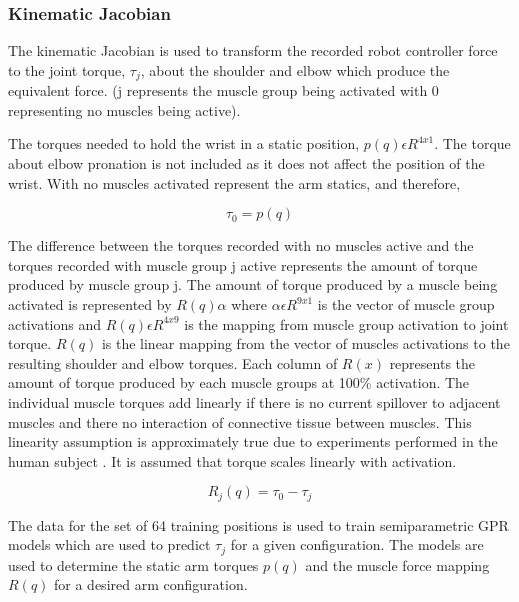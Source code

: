 \subsubsection{Kinematic Jacobian}
The kinematic Jacobian is used to transform the recorded robot controller force to the joint torque, $\tau_j$, about the shoulder and elbow which produce the equivalent force. (j represents the muscle group being activated with 0 representing no muscles being active).

The torques needed to hold the wrist in a static position, $p(q) \epsilon R^{4x1}$. The torque about elbow pronation is not included as it does not affect the position of the wrist. With no muscles activated represent the arm statics, and therefore, 

\begin{equation}
    \tau_0 = p(q)
\end{equation}

The difference between the torques recorded with no muscles active and the torques recorded with muscle group j active represents the amount of torque produced by muscle group j. The amount of torque produced by a muscle being activated is represented by $R(q)\alpha$ where $\alpha \epsilon R^{9x1}$ is the vector of muscle group activations and $R(q) \epsilon R^{4x9}$ is the mapping from muscle group activation to joint torque. $R(q)$ is the linear mapping from the vector of muscles activations to the resulting shoulder and elbow torques. Each column of $R(x)$ represents the amount of torque produced by each muscle groups at 100\% activation. The individual muscle torques add linearly if there is no current spillover to adjacent muscles and there no interaction of connective tissue between muscles. This linearity assumption is approximately true due to experiments performed in the human subject \cite{SPI}. It is assumed that torque scales linearly with activation. 

\begin{equation}
    R_j(q) = \tau_0 - \tau_j
\end{equation}

The data for the set of 64 training positions is used to train semiparametric GPR models which are used to predict $\tau_j$ for a given configuration. The models are used to determine the static arm torques $p(q)$ and the muscle force mapping $R(q)$ for a desired arm configuration.

